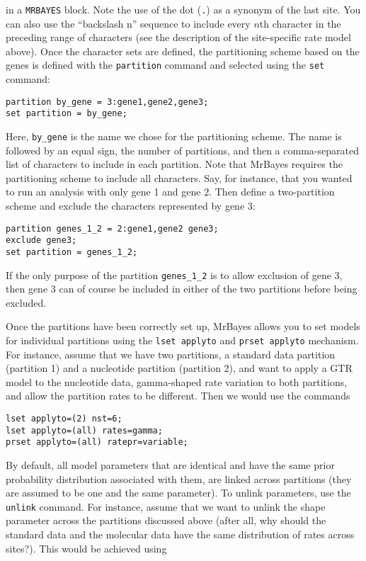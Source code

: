 \documentclass[12pt]{book}
\begin{document}
in a \texttt{MRBAYES} block. Note the use of the dot (\texttt{.}) as a synonym of the last site.
You can also use the ``backslash n'' sequence to include every $n$th character in the preceding
range of characters (see the description of the site-specific rate model above). Once the character
sets are defined, the partitioning scheme based on the genes is defined with the \texttt{partition}
command and selected using the \texttt{set} command:

\begin{Verbatim}
partition by_gene = 3:gene1,gene2,gene3;
set partition = by_gene;
\end{Verbatim}

Here, \texttt{by\_gene} is the name we chose for the partitioning scheme. The name is followed by
an equal sign, the number of partitions, and then a comma-separated list of characters to include
in each partition. Note that MrBayes requires the partitioning scheme to include all characters.
Say, for instance, that you wanted to run an analysis with only gene 1 and gene 2. Then define a
two-partition scheme and exclude the characters represented by gene 3:

\begin{Verbatim}
partition genes_1_2 = 2:gene1,gene2 gene3;
exclude gene3;
set partition = genes_1_2;
\end{Verbatim}

If the only purpose of the partition \texttt{genes\_1\_2} is to allow exclusion of gene 3, then
gene 3 can of course be included in either of the two partitions before being excluded.

Once the partitions have been correctly set up, MrBayes allows you to set models for individual
partitions using the \texttt{lset applyto} and \texttt{prset applyto} mechanism. For instance,
assume that we have two partitions, a standard data partition (partition 1) and a nucleotide
partition (partition 2), and want to apply a GTR model to the nucleotide data, gamma-shaped rate
variation to both partitions, and allow the partition rates to be different. Then we would use the
commands

\begin{Verbatim}
lset applyto=(2) nst=6;
lset applyto=(all) rates=gamma;
prset applyto=(all) ratepr=variable;
\end{Verbatim}

By default, all model parameters that are identical and have the same prior probability
distribution associated with them, are linked across partitions (they are assumed to be one and the
same parameter). To unlink parameters, use the \texttt{unlink} command. For instance, assume that
we want to unlink the shape parameter across the partitions discussed above (after all, why should
the standard data and the molecular data have the same distribution of rates across sites?). This
would be achieved using
\end{document}
